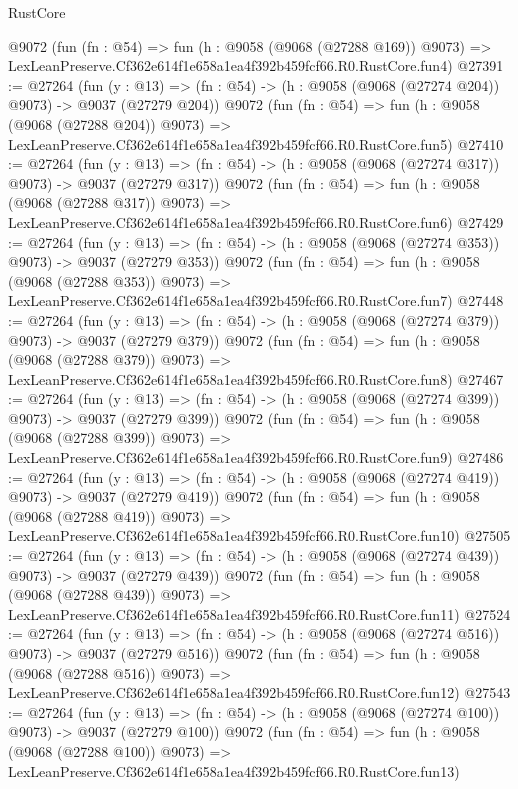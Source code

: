 \begin{lexlean}{RustCore}
\begin{coremodule}
    @9072
    (fun (fn : @54) =>
    fun (h : @9058 (@9068 (@27288 @169)) @9073) =>
    LexLeanPreserve.Cf362e614f1e658a1ea4f392b459fcf66.R0.RustCore.fun4)
@27391 := @27264
    (fun (y : @13) => (fn : @54) -> (h : @9058 (@9068 (@27274 @204)) @9073) -> @9037 (@27279 @204))
    @9072
    (fun (fn : @54) =>
    fun (h : @9058 (@9068 (@27288 @204)) @9073) =>
    LexLeanPreserve.Cf362e614f1e658a1ea4f392b459fcf66.R0.RustCore.fun5)
@27410 := @27264
    (fun (y : @13) => (fn : @54) -> (h : @9058 (@9068 (@27274 @317)) @9073) -> @9037 (@27279 @317))
    @9072
    (fun (fn : @54) =>
    fun (h : @9058 (@9068 (@27288 @317)) @9073) =>
    LexLeanPreserve.Cf362e614f1e658a1ea4f392b459fcf66.R0.RustCore.fun6)
@27429 := @27264
    (fun (y : @13) => (fn : @54) -> (h : @9058 (@9068 (@27274 @353)) @9073) -> @9037 (@27279 @353))
    @9072
    (fun (fn : @54) =>
    fun (h : @9058 (@9068 (@27288 @353)) @9073) =>
    LexLeanPreserve.Cf362e614f1e658a1ea4f392b459fcf66.R0.RustCore.fun7)
@27448 := @27264
    (fun (y : @13) => (fn : @54) -> (h : @9058 (@9068 (@27274 @379)) @9073) -> @9037 (@27279 @379))
    @9072
    (fun (fn : @54) =>
    fun (h : @9058 (@9068 (@27288 @379)) @9073) =>
    LexLeanPreserve.Cf362e614f1e658a1ea4f392b459fcf66.R0.RustCore.fun8)
@27467 := @27264
    (fun (y : @13) => (fn : @54) -> (h : @9058 (@9068 (@27274 @399)) @9073) -> @9037 (@27279 @399))
    @9072
    (fun (fn : @54) =>
    fun (h : @9058 (@9068 (@27288 @399)) @9073) =>
    LexLeanPreserve.Cf362e614f1e658a1ea4f392b459fcf66.R0.RustCore.fun9)
@27486 := @27264
    (fun (y : @13) => (fn : @54) -> (h : @9058 (@9068 (@27274 @419)) @9073) -> @9037 (@27279 @419))
    @9072
    (fun (fn : @54) =>
    fun (h : @9058 (@9068 (@27288 @419)) @9073) =>
    LexLeanPreserve.Cf362e614f1e658a1ea4f392b459fcf66.R0.RustCore.fun10)
@27505 := @27264
    (fun (y : @13) => (fn : @54) -> (h : @9058 (@9068 (@27274 @439)) @9073) -> @9037 (@27279 @439))
    @9072
    (fun (fn : @54) =>
    fun (h : @9058 (@9068 (@27288 @439)) @9073) =>
    LexLeanPreserve.Cf362e614f1e658a1ea4f392b459fcf66.R0.RustCore.fun11)
@27524 := @27264
    (fun (y : @13) => (fn : @54) -> (h : @9058 (@9068 (@27274 @516)) @9073) -> @9037 (@27279 @516))
    @9072
    (fun (fn : @54) =>
    fun (h : @9058 (@9068 (@27288 @516)) @9073) =>
    LexLeanPreserve.Cf362e614f1e658a1ea4f392b459fcf66.R0.RustCore.fun12)
@27543 := @27264
    (fun (y : @13) => (fn : @54) -> (h : @9058 (@9068 (@27274 @100)) @9073) -> @9037 (@27279 @100))
    @9072
    (fun (fn : @54) =>
    fun (h : @9058 (@9068 (@27288 @100)) @9073) =>
    LexLeanPreserve.Cf362e614f1e658a1ea4f392b459fcf66.R0.RustCore.fun13)

\end{coremodule}
\end{lexlean}
